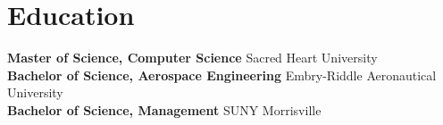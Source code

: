 \section*{Education}
\noindent
\textbf{Master of Science, Computer Science} \hfill Sacred Heart University \\
\textbf{Bachelor of Science, Aerospace Engineering} \hfill Embry-Riddle Aeronautical University \\
\textbf{Bachelor of Science, Management} \hfill SUNY Morrisville